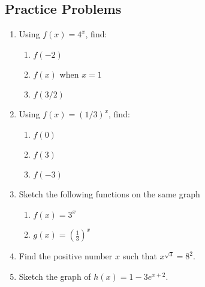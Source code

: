 \documentclass[11pt]{book}               %
\begin{document}
\subsection{Practice Problems}
\begin{enumerate}
\item Using $ f(x) = 4^x$, find: 
\begin{enumerate}
\item $f(-2)$ 
\item $f(x)$ when $ x = 1$ 
\item $f(3/2)$ 
\end{enumerate}
\item Using $ f(x) = (1/3)^x$, find: 
\begin{enumerate}
\item $f(0)$ 
\item $f(3)$ 
\item $f(-3)$ 
\end{enumerate}
\item Sketch the following functions on the same graph
\begin{enumerate}
\item $f(x)=3^x$ 
\item $g(x)=(\frac{1}{3})^x$ 
\end{enumerate}
\item Find the positive number $x$  such that $x^{\sqrt{3}} = 8^2$.
\item Sketch the graph of $ h(x)=1-3e^{x+2}$.
\end{enumerate}
\end{document}
